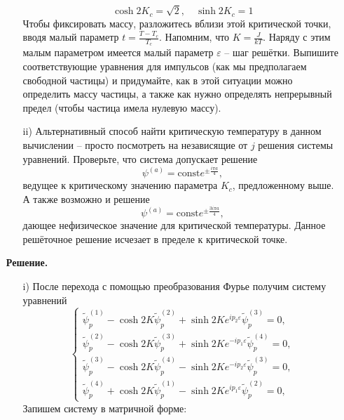 \documentclass[12pt]{article}
\theoremstyle{definition}
\begin{document}
\begin{enumerate}
\begin{itemize}
    \begin{equation}
        \cosh2K_c=\sqrt{2},\quad\sinh2K_c=1
    \end{equation}
    Чтобы фиксировать массу, разложитесь вблизи этой критической точки, вводя малый параметр $t=\frac{T-T_c}{T_c}$. Напомним, что $K=\frac{J}{kT}$. Наряду с этим малым параметром имеется малый параметр $\varepsilon$ -- шаг решётки. Выпишите соответствующие уравнения для импульсов (как мы предполагаем свободной частицы) и придумайте, как в этой ситуации можно определить массу частицы, а также как нужно определять непрерывный предел (чтобы частица имела нулевую массу).
    \item[ii)] Альтернативный способ найти критическую температуру в данном вычислении -- просто посмотреть на независящие от $j$ решения системы уравнений. Проверьте, что система допускает решение
    \begin{equation}
        \psi^{(a)}=\text{const}e^{\pm\frac{i\pi a}{4}},
    \end{equation}
    ведущее к критическому значению параметра $K_c$, предложенному выше. А также возможно и решение
    \begin{equation}
        \psi^{(a)}=\text{const}e^{\pm\frac{3i\pi a}{4}},
    \end{equation}
    дающее нефизическое значение для критической температуры. Данное решёточное решение исчезает в пределе к критической точке.
\end{itemize}
\textbf{Решение.}
\begin{itemize}
    \item[i)] После перехода с помощью преобразования Фурье получим систему уравнений
    \begin{equation}\label{eq1}
        \begin{cases}
            \tilde\psi_p^{(1)}-\cosh2K\tilde\psi_p^{(2)}+\sinh2Ke^{ip_2\varepsilon}\tilde\psi_p^{(3)}=0,\\
            \tilde\psi_p^{(2)}-\cosh2K\tilde\psi_p^{(3)}+\sinh2Ke^{-ip_1\varepsilon}\tilde\psi_p^{(4)}=0,\\
            \tilde\psi_p^{(3)}-\cosh2K\tilde\psi_p^{(4)}-\sinh2Ke^{-ip_2\varepsilon}\tilde\psi_p^{(3)}=0,\\
            \tilde\psi_p^{(4)}+\cosh2K\tilde\psi_p^{(1)}-\sinh2Ke^{ip_1\varepsilon}\tilde\psi_p^{(2)}=0,
        \end{cases}
    \end{equation}
    Запишем систему в матричной форме:
    \begin{equation*}

\end{equation*}
\end{itemize}
\end{enumerate}
\end{document}
